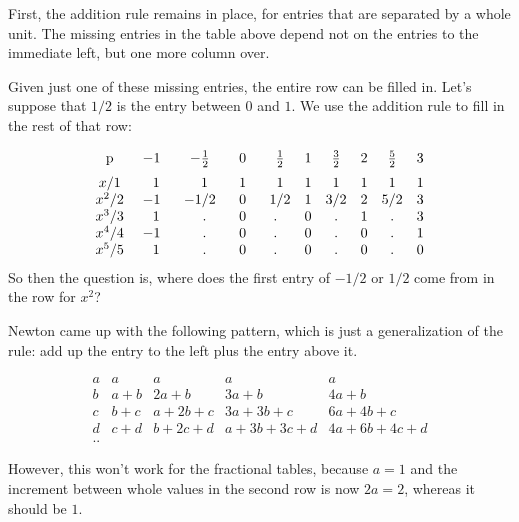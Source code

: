\documentclass[11pt, oneside]{article}
\begin{document}
First, the addition rule remains in place, for entries that are separated by a whole unit.  The missing entries in the table above depend not on the entries to the immediate left, but one more column over.  

Given just one of these missing entries, the entire row can be filled in.  Let's suppose that $1/2$ is the entry between $0$ and $1$.  We use the addition rule to fill in the rest of that row:

\[
\begin{matrix}
\text{p}  \vspace{2 mm} \\
x/1  \\
x^2/2 \\
x^3/3 \\
x^4/4 \\
x^5/5
\end{matrix} \ \ \ \
\begin{matrix}
-1 & -\frac{1}{2} & 0& \ \ \frac{1}{2} & 1& \frac{3}{2}  & 2 & \frac{5}{2}  & 3   \vspace{2 mm}  \\
\ \ 1 & \ \ 1 & 1 & \ \ 1 & 1 & 1 & 1 & 1 & 1 \\
-1 & \ \ -1/2 \ \ & 0 & \ \ 1/2 & 1 & 3/2 & 2 & 5/2 & 3 \\
\ \ 1 & \ \ . & 0 &  . & 0 & . & 1 & . & 3 \\
-1 &  \ \ .  & 0 & . & 0 & . & 0 & . & 1 \\
\ \ 1 &  \ \ . & 0 & . & 0 & . & 0 & . & 0 \\
\end{matrix}
\]
So then the question is, where does the first entry of $-1/2$ or $1/2$ come from in the row for $x^2$?

Newton came up with the following pattern, which is just a generalization of the rule:  add up the entry to the left plus the entry above it.

\[
\begin{matrix}
a & a & a & a & a  \\
b & a+b & 2a+b & 3a + b & 4a+b  \\
c &  b + c & a + 2b + c & 3a + 3b + c & 6a + 4b + c \\
d & c + d & b + 2c + d &  a + 3b + 3c + d & 4a + 6b + 4c + d  \\
..
\end{matrix}
\]

However, this won't work for the fractional tables, because $a = 1$ and the increment between whole values in the second row is now $2a = 2$, whereas it should be $1$.
\end{document}

